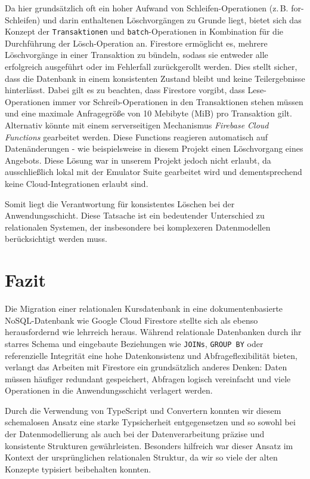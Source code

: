 \documentclass[12pt,a4paper%
              ,oneside     %
              ,titlepage
              ,DIV=13
              ,headinclude
              ,footinclude=false%
              ,cleardoublepage=empty%
              ,parskip=half,
              BCOR=0mm,
              ]{scrreprt}
\begin{document}
Da hier grundsätzlich oft ein hoher Aufwand von Schleifen-Operationen (z.\,B. for-Schleifen) und darin enthaltenen Löschvorgängen zu Grunde liegt, bietet sich das Konzept der \texttt{Transaktionen} und \texttt{batch}-Operationen \cite{Firebase.TransaktionenBatch} in Kombination für die Durchführung der Lösch-Operation an. Firestore ermöglicht es, mehrere Löschvorgänge in einer Transaktion zu bündeln, sodass sie entweder alle erfolgreich ausgeführt oder im Fehlerfall zurückgerollt werden. Dies stellt sicher, dass die Datenbank in einem konsistenten Zustand bleibt und keine Teilergebnisse hinterlässt.
Dabei gilt es zu beachten, dass Firestore vorgibt, dass Lese-Operationen immer vor Schreib-Operationen in den Transaktionen stehen müssen und eine maximale Anfragegröße von 10 Mebibyte (MiB) pro Transaktion gilt.
Alternativ könnte mit einem serverseitigen Mechanismus \textit{Firebase Cloud Functions} \cite{Firebase.CloudFunctions} gearbeitet werden. Diese Functions reagieren automatisch auf Datenänderungen - wie beispielsweise in diesem Projekt einen Löschvorgang eines Angebots. Diese Lösung war in unserem Projekt jedoch nicht erlaubt, da ausschließlich lokal mit der Emulator Suite gearbeitet wird und dementsprechend keine Cloud-Integrationen erlaubt sind.

Somit liegt die Verantwortung für konsistentes Löschen bei der Anwendungsschicht. Diese Tatsache ist ein bedeutender Unterschied zu relationalen Systemen, der insbesondere bei komplexeren Datenmodellen berücksichtigt werden muss.

\chapter{Fazit}

Die Migration einer relationalen Kursdatenbank in eine dokumentenbasierte NoSQL-Datenbank wie Google Cloud Firestore stellte sich als ebenso herausfordernd wie lehrreich heraus. Während relationale Datenbanken durch ihr starres Schema und eingebaute Beziehungen wie \texttt{JOINs}, \texttt{GROUP BY} oder referenzielle Integrität eine hohe Datenkonsistenz und Abfrageflexibilität bieten, verlangt das Arbeiten mit Firestore ein grundsätzlich anderes Denken: Daten müssen häufiger redundant gespeichert, Abfragen logisch vereinfacht und viele Operationen in die Anwendungsschicht verlagert werden.

Durch die Verwendung von TypeScript und Convertern konnten wir diesem schemalosen Ansatz eine starke Typsicherheit entgegensetzen und so sowohl bei der Datenmodellierung als auch bei der Datenverarbeitung präzise und konsistente Strukturen gewährleisten. Besonders hilfreich war dieser Ansatz im Kontext der ursprünglichen relationalen Struktur, da wir so viele der alten Konzepte typisiert beibehalten konnten.
\end{document}
